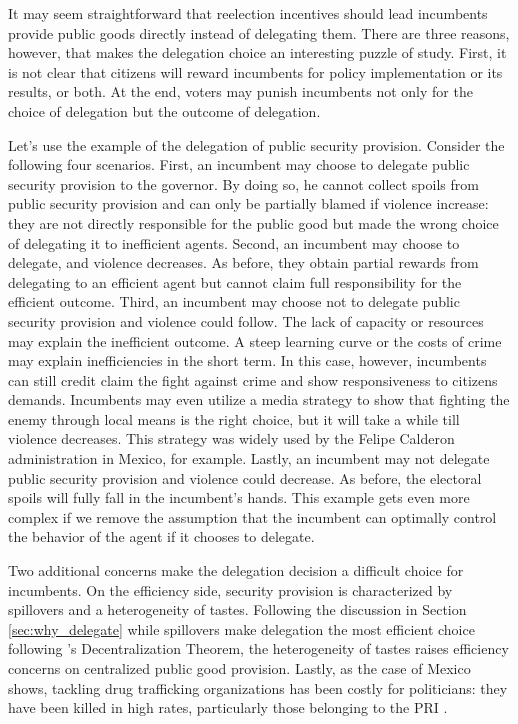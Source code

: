 \documentclass[12pt]{amsart}
\makeatletter
\def\subsection{\@startsection{subsection}{2}
	\z@{.8\linespacing\@plus.7\linespacing}{.7\linespacing}{\large}}
\numberwithin{equation}{section}
\theoremstyle{definition}
\theoremstyle{definition}
\theoremstyle{definition}
\makeatother
\begin{document}
\subsection{The puzzle \label{sec:puzzle}} 

It may seem straightforward that reelection incentives should lead incumbents provide public goods directly instead of delegating them. There are three reasons, however, that makes the delegation choice an interesting puzzle of study. First, it is not clear that citizens will reward incumbents for policy implementation or its results, or both. At the end, voters may punish incumbents not only for the choice of delegation but the outcome of delegation. 

Let’s use the example of the delegation of public security provision. Consider the following four scenarios. First, an incumbent may choose to delegate public security provision to the governor. By doing so, he cannot collect spoils from public security provision and can only be partially blamed if violence increase: they are not directly responsible for the public good but made the wrong choice of delegating it to inefficient agents. Second, an incumbent may choose to delegate, and violence decreases. As before, they obtain partial rewards from delegating to an efficient agent but cannot claim full responsibility for the efficient outcome. Third, an incumbent may choose not to delegate public security provision and violence could follow. The lack of capacity or resources may explain the inefficient outcome. A steep learning curve or the costs of crime may explain inefficiencies in the short term. In this case, however, incumbents can still credit claim the fight against crime and show responsiveness to citizens demands. Incumbents may even utilize a media strategy to show that fighting the enemy through local means is the right choice, but it will take a while till violence decreases. This strategy was widely used by the Felipe Calderon administration in Mexico, for example.  Lastly, an incumbent may not delegate public security provision and violence could decrease. As before, the electoral spoils will fully fall in the incumbent’s hands. This example gets even more complex if we remove the assumption that the incumbent can optimally control the behavior of the agent if it chooses to delegate. 
   
Two additional concerns make the delegation decision a difficult choice for incumbents. On the efficiency side, security provision is characterized by spillovers and a heterogeneity of tastes. Following the discussion in Section \ref{sec:why_delegate}  while spillovers make delegation the most efficient choice following \citet{oates_1972}'s Decentralization Theorem, the heterogeneity of tastes raises efficiency concerns on centralized public good provision. Lastly, as the case of Mexico shows, tackling drug trafficking organizations has been costly for politicians: they have been killed in high rates, particularly those belonging to the PRI \citep{ley_trejo_2020}.  
\end{document}
